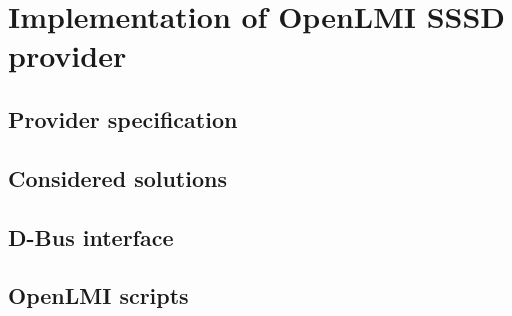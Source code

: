 \chapter{Implementation of OpenLMI SSSD provider}

\section{Provider specification}

\section{Considered solutions}

\section{D-Bus interface}

\section{OpenLMI scripts}